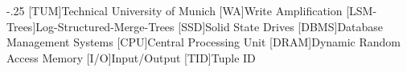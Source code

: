 \documentclass[headsepline,footsepline,footinclude=false,oneside,fontsize=11pt,paper=a4,listof=totoc,bibliography=totoc]{scrbook} %
\begin{document}


\frontmatter{}





\tableofcontents{}

\mainmatter{}










\appendix{}



\begin{acronym}
	\itemsep-.25\baselineskip
	[TUM]{Technical University of Munich}
	[WA]{Write Amplification}
	[LSM-Trees]{Log-Structured-Merge-Trees}
	[SSD]{Solid State Drives}
	[DBMS]{Database Management Systems}
	[CPU]{Central Processing Unit}
	[DRAM]{Dynamic Random Access Memory}
	[I/O]{Input/Output}
	[TID]{Tuple ID}
\end{acronym}

\listoffigures{}
\listoftables{}
\printbibliography{}
\end{document}
